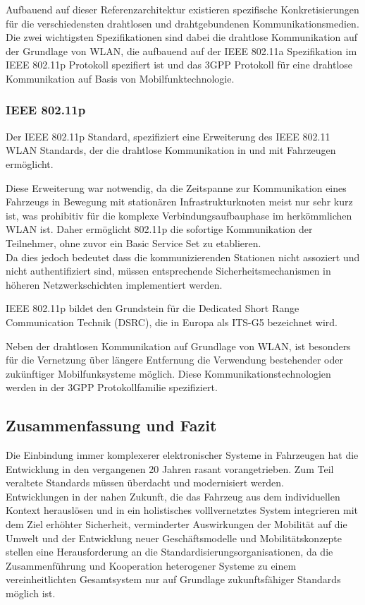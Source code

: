     Aufbauend auf dieser Referenzarchitektur existieren spezifische Konkretisierungen für die verschiedensten drahtlosen und drahtgebundenen Kommunikationsmedien.
    Die zwei wichtigsten Spezifikationen sind dabei die drahtlose Kommunikation auf der Grundlage von WLAN, die aufbauend auf der IEEE 802.11a Spezifikation im IEEE 802.11p Protokoll \cite{BP10} spezifiert ist 
    und das 3GPP Protokoll für eine drahtlose Kommunikation auf Basis von Mobilfunktechnologie.

    \subsubsection{IEEE 802.11p}
    Der IEEE 802.11p Standard, spezifiziert eine Erweiterung des IEEE 802.11 WLAN Standards, der die drahtlose Kommunikation in und mit Fahrzeugen ermöglicht.

    Diese Erweiterung war notwendig, da die Zeitspanne zur Kommunikation eines Fahrzeugs in Bewegung mit stationären Infrastrukturknoten meist nur sehr kurz ist, was prohibitiv für die komplexe Verbindungsaufbauphase
    im herkömmlichen WLAN ist. Daher ermöglicht 802.11p die sofortige Kommunikation der Teilnehmer, ohne zuvor ein Basic Service Set zu etablieren.\\
    Da dies jedoch bedeutet dass die kommunizierenden Stationen nicht assoziert und nicht authentifiziert sind, müssen entsprechende Sicherheitsmechanismen in höheren Netzwerkschichten
    implementiert werden.

    IEEE 802.11p bildet den Grundstein für die Dedicated Short Range Communication Technik (DSRC), die in Europa als ITS-G5 bezeichnet wird. 
    
    Neben der drahtlosen Kommunikation auf Grundlage von WLAN, ist besonders für die Vernetzung über längere Entfernung die Verwendung bestehender oder zukünftiger Mobilfunksysteme möglich.
    Diese Kommunikationstechnologien werden in der 3GPP Protokollfamilie spezifiziert.

   
    \subsection{Zusammenfassung und Fazit}
    Die Einbindung immer komplexerer elektronischer Systeme in Fahrzeugen hat die Entwicklung in den vergangenen
    20 Jahren rasant vorangetrieben. Zum Teil veraltete Standards müssen überdacht und modernisiert werden.\\
    Entwicklungen in der nahen Zukunft, die das Fahrzeug aus dem individuellen Kontext herauslösen und in ein holistisches volllvernetztes
    System integrieren mit dem Ziel erhöhter Sicherheit, verminderter Auswirkungen der Mobilität auf die Umwelt und der Entwicklung neuer Geschäftsmodelle
    und Mobilitätskonzepte stellen eine Herausforderung an die Standardisierungsorganisationen, da die Zusammenführung und Kooperation heterogener Systeme zu einem
    vereinheitlichten Gesamtsystem nur auf Grundlage zukunftsfähiger Standards möglich ist.\\
    

